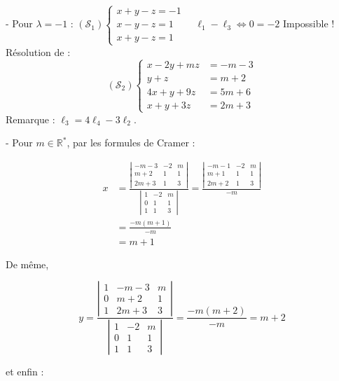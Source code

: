 {- Pour $\lambda=-1$ :
$\left(\mathcal{S}_1\right)\left\{\begin{array}{l}x+y-z=-1 \\ x-y-z=1 \\ x+y-z=1\end{array} \quad \ell_1-\ell_3 \Leftrightarrow 0=-2\right.$ Impossible !
Résolution de :
$$
\left(\mathcal{S}_2\right)\left\{\begin{aligned}
x-2 y+m z & =-m-3 \\
y+z & =m+2 \\
4 x+y+9 z & =5 m+6 \\
x+y+3 z & =2 m+3
\end{aligned}\right.
$$
Remarque : $\ell_3=4 \ell_4-3 \ell_2$.

- Pour $m \in \mathbb{R}^*$, par les formules de Cramer :

$$
\begin{aligned}
x & =\frac{\left|\begin{array}{ccc}
-m-3 & -2 & m \\
m+2 & 1 & 1 \\
2 m+3 & 1 & 3
\end{array}\right|}{\left|\begin{array}{ccc}
1 & -2 & m \\
0 & 1 & 1 \\
1 & 1 & 3
\end{array}\right|}=\frac{\left|\begin{array}{ccc}
-m-1 & -2 & m \\
m+1 & 1 & 1 \\
2 m+2 & 1 & 3
\end{array}\right|}{-m} \\
& =\frac{-m(m+1)}{-m} \\
& =m+1
\end{aligned}
$$

De même, 

$$y = 
\frac{\left|\begin{array}{ccc}
1 & -m-3 & m \\
0 & m+2 & 1 \\
1 & 2 m+3 & 3
\end{array}\right|}{\left|\begin{array}{ccc}
1 & -2 & m \\
0 & 1 & 1 \\
1 & 1 & 3
\end{array}\right|} =\frac{-m(m+2)}{-m} = m+2 
$$

et enfin : 

}
